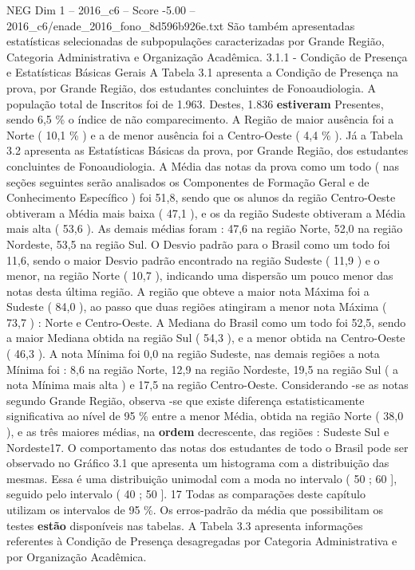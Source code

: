 \begin{textsample}{NEG Dim 1 – 2016\_c6 – Score -5.00 – 2016\_c6/enade\_2016\_fono\_8d596b926e.txt}
São também apresentadas estatísticas selecionadas de subpopulações caracterizadas por Grande Região, Categoria Administrativa e Organização Acadêmica. 3.1.1 - Condição de Presença e Estatísticas Básicas Gerais A Tabela 3.1 apresenta a Condição de Presença na prova, por Grande Região, dos estudantes concluintes de Fonoaudiologia.
A população total de Inscritos foi de 1.963.
Destes, 1.836 \textbf{estiveram} Presentes, sendo 6,5 \% o índice de não comparecimento.
A Região de maior ausência foi a Norte ( 10,1 \% ) e a de menor ausência foi a Centro-Oeste ( 4,4 \% ).
Já a Tabela 3.2 apresenta as Estatísticas Básicas da prova, por Grande Região, dos estudantes concluintes de Fonoaudiologia.
A Média das notas da prova como um todo ( nas seções seguintes serão analisados os Componentes de Formação Geral e de Conhecimento Específico ) foi 51,8, sendo que os alunos da região Centro-Oeste obtiveram a Média mais baixa ( 47,1 ), e os da região Sudeste obtiveram a Média mais alta ( 53,6 ).
As demais médias foram : 47,6 na região Norte, 52,0 na região Nordeste, 53,5 na região Sul.
O Desvio padrão para o Brasil como um todo foi 11,6, sendo o maior Desvio padrão encontrado na região Sudeste ( 11,9 ) e o menor, na região Norte ( 10,7 ), indicando uma dispersão um pouco menor das notas desta última região.
A região que obteve a maior nota Máxima foi a Sudeste ( 84,0 ), ao passo que duas regiões atingiram a menor nota Máxima ( 73,7 ) : Norte e Centro-Oeste.
A Mediana do Brasil como um todo foi 52,5, sendo a maior Mediana obtida na região Sul ( 54,3 ), e a menor obtida na Centro-Oeste ( 46,3 ).
A nota Mínima foi 0,0 na região Sudeste, nas demais regiões a nota Mínima foi : 8,6 na região Norte, 12,9 na região Nordeste, 19,5 na região Sul ( a nota Mínima mais alta ) e 17,5 na região Centro-Oeste.
Considerando -se as notas segundo Grande Região, observa -se que existe diferença estatisticamente significativa ao nível de 95 \% entre a menor Média, obtida na região Norte ( 38,0 ), e as três maiores médias, na \textbf{ordem} decrescente, das regiões : Sudeste Sul e Nordeste17.
O comportamento das notas dos estudantes de todo o Brasil pode ser observado no Gráfico 3.1 que apresenta um histograma com a distribuição das mesmas.
Essa é uma distribuição unimodal com a moda no intervalo ( 50 ; 60 ], seguido pelo intervalo ( 40 ; 50 ]. 17 Todas as comparações deste capítulo utilizam os intervalos de 95 \%.
Os erros-padrão da média que possibilitam os testes \textbf{estão} disponíveis nas tabelas.
A Tabela 3.3 apresenta informações referentes à Condição de Presença desagregadas por Categoria Administrativa e por Organização Acadêmica.

\end{textsample}
